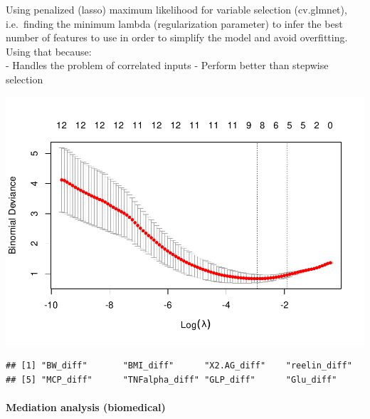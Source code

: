 \documentclass[
]{article}
\begin{document}
\hfill\break
Using penalized (lasso) maximum likelihood for variable selection
(cv.glmnet), i.e.~finding the minimum lambda (regularization parameter)
to infer the best number of features to use in order to simplify the
model and avoid overfitting.\\
Using that because:\\
- Handles the problem of correlated inputs - Perform better than
stepwise selection

\begin{center}\includegraphics{OBIWAN_LIRA_files/figure-latex/var_sel-1} \end{center}

\begin{verbatim}
## [1] "BW_diff"       "BMI_diff"      "X2.AG_diff"    "reelin_diff"  
## [5] "MCP_diff"      "TNFalpha_diff" "GLP_diff"      "Glu_diff"
\end{verbatim}

\hypertarget{mediation-analysis-biomedical}{%
\paragraph{Mediation analysis
(biomedical)}\label{mediation-analysis-biomedical}}
\end{document}

